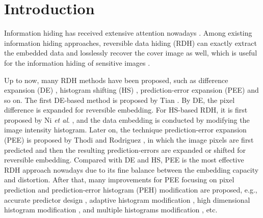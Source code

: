\documentclass[review,3p,10pt,sort&compress]{elsarticle}
\begin{document}
\section{Introduction}\label{sec:1}

Information hiding has received extensive attention nowadays \cite{IJcox,Fridrich}. Among existing information hiding approaches, reversible data hiding (RDH) can exactly extract the embedded data and losslessly recover the cover image as well, which is useful for the information hiding of sensitive images \cite{shi}.

Up to now, many RDH methods have been proposed, such as difference expansion (DE) \cite{
Tian2003DE,
Qin2013An,
Thodi2007Expansion,
Hu2009DE,
Li2013A},
histogram shifting (HS) \cite{
Hong2009Reversible,
Hong2010A,
Xiaolong2013General,
Wang2018A},
prediction-error expansion (PEE) \cite{
Sachnev2009Reversible,
Tsai2009Reversible,
Gao2011Lossless,
Li2011Efficient,
Hong2011Adaptive,
Wu2012Reversible,
Qin2013An,
Ou2013Pairwise,
Dragoi2014Local,
Li2015Efficient,
Dragoi2016Adaptive,
Wang2017Rate}
and so on.
The first DE-based method is proposed by Tian \cite{Tian2003DE}. By DE, the pixel difference is expanded for reversible embedding.
For HS-based RDH, it is first proposed by Ni \emph{et al}. \cite{hs1}, and the data embedding is conducted by modifying the image intensity histogram.
Later on, the technique prediction-error expansion (PEE) is proposed by Thodi and Rodriguez \cite{Thodi2007Expansion}, in which the image pixels are first predicted and then the resulting prediction-errors are expanded or shifted for reversible embedding. Compared with DE and HS, PEE is the most effective RDH approach nowadays due to its fine balance between the embedding capacity and distortion.
After that, many improvements for PEE focusing on pixel prediction and prediction-error histogram (PEH) modification are proposed, e.g., accurate predictor design \cite{Thodi2007Expansion,Fallahpour2008Reversible,Hu2009DE,Hong2009Reversible,Sachnev2009Reversible,Ioan2014Local,Ioan2015On}, adaptive histogram modification \cite{}, high dimensional histogram modification \cite{Ou2013Pairwise,Li2013A,Dragoi2016Adaptive}, and multiple histograms modification \cite{Li2015Efficient,Xiang2015A,Bo2016Improved}, etc.
\end{document}
